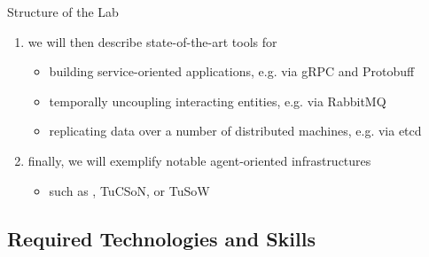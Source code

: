 \documentclass[presentation]{beamer}\mode<presentation>{\usetheme{AMSBolognaFC}}
\begin{document}
\begin{frame}[c,allowframebreaks]{Structure of the Lab}
\begin{enumerate}
        \medskip

        \item we will then describe state-of-the-art tools for
        \begin{itemize}
            \item building \alert{service-oriented applications}, e.g. via gRPC and Protobuff
            \item \alert{temporally uncoupling} interacting entities, e.g. via RabbitMQ
            \item \alert{replicating} data over a number of distributed machines, e.g. via etcd
        \end{itemize}

        \medskip

        \item finally, we will exemplify notable \alert{agent-oriented infrastructures}
        \begin{itemize}
            \item such as \jade{}, TuCSoN, or TuSoW
        \end{itemize}

    \end{enumerate}

\end{frame}

\subsection{Required Technologies and Skills}
\end{document}
